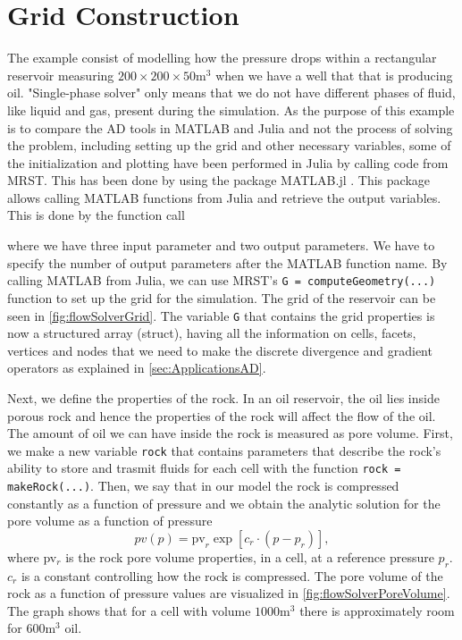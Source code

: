 \section{Grid Construction}
\label{sec:GridConstruction}
The example consist of modelling how the pressure drops within a rectangular reservoir measuring $200\times 200 \times 50 \text{m}^3$ when we have a well that that is producing oil. "Single-phase solver" only means that we do not have different phases of fluid, like liquid and gas, present during the simulation. As the purpose of this example is to compare the AD tools in MATLAB and Julia and not the process of solving the problem, including setting up the grid and other necessary variables, some of the initialization and plotting have been performed in Julia by calling code from MRST. This has been done by using the package MATLAB.jl \emph{\citep{MATLAB.jl}}. This package allows calling MATLAB functions from Julia and retrieve the output variables. This is done by the function call

where we have three input parameter and two output parameters. We have to specify the number of output parameters after the MATLAB function name.  By calling MATLAB from Julia, we can use MRST's \texttt{G = computeGeometry(...)} function to set up the grid for the simulation. The grid of the reservoir can be seen in \autoref{fig:flowSolverGrid}. The variable \texttt{G} that contains the grid properties is now a structured array (struct), having all the information on cells, facets, vertices and nodes that we need to make the discrete divergence and gradient operators as explained in \autoref{sec:ApplicationsAD}. 

Next, we define the properties of the rock. In an oil reservoir, the oil lies inside porous rock and hence the properties of the rock will affect the flow of the oil. The amount of oil we can have inside the rock is measured as pore volume. First, we make a new variable \texttt{rock} that contains parameters that describe the rock's ability to store and trasmit fluids for each cell with the function \texttt{rock = makeRock(...)}. Then, we say that in our model the rock is compressed constantly as a function of pressure and we obtain the analytic solution for the pore volume as a function of pressure
\begin{equation}
    pv(p) = \text{pv}_r \exp[c_r\cdot(p-p_r)],
    \label{eq:poreVolume}
\end{equation}
where pv$_r$ is the rock pore volume properties, in a cell, at a reference pressure $p_r$. $c_r$ is a constant controlling how the rock is compressed. The pore volume of the rock as a function of pressure values are visualized in \autoref{fig:flowSolverPoreVolume}. The graph shows that for a cell with volume $1000\text{m}^3$ there is approximately room for $600\text{m}^3$ oil.

